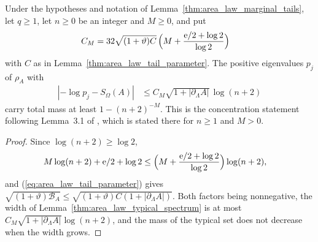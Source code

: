\begin{lemma}
    \label{thm:area_law_typical_spectrum_boundary}
    \leanok
    Under the hypotheses and notation of
    Lemma~\ref{thm:area_law_marginal_tails}, let $q\ge1$, let $n\ge0$ be
    an integer and $M\ge0$, and put
    \begin{align}
        C_M & =32\sqrt{(1+\vartheta)C}\,
        \Bigl(M+\frac{\mathrm e/2+\log2}{\log2}\Bigr)
    \end{align}
    with $C$ as in Lemma~\ref{thm:area_law_tail_parameter}. The positive
    eigenvalues $p_j$ of $\rho_A$ with
    \begin{align}
        |-\log p_j-S_\Omega(A)| & \le C_M\sqrt{1+|\partial_\Lambda A|}\,\log(n+2)
    \end{align}
    carry total mass at least $1-(n+2)^{-M}$. This is the concentration
    statement following Lemma~3.1 of \cite{OpenAI2026AreaLaw}, which is
    stated there for $n\ge1$ and $M>0$.
\end{lemma}
\begin{proof}\leanok
    Since $\log(n+2)\ge\log2$,
    \begin{align}
        M\log(n+2)+\mathrm e/2+\log2
         & \le\Bigl(M+\frac{\mathrm e/2+\log2}{\log2}\Bigr)\log(n+2),
    \end{align}
    and (\ref{eq:area_law_tail_parameter}) gives
    $\sqrt{(1+\vartheta)\mathcal B_A}\le\sqrt{(1+\vartheta)C(1+|\partial_\Lambda A|)}$.
    Both factors being nonnegative, the width of
    Lemma~\ref{thm:area_law_typical_spectrum} is at most
    $C_M\sqrt{1+|\partial_\Lambda A|}\log(n+2)$, and the mass of the typical
    set does not decrease when the width grows.
\end{proof}
